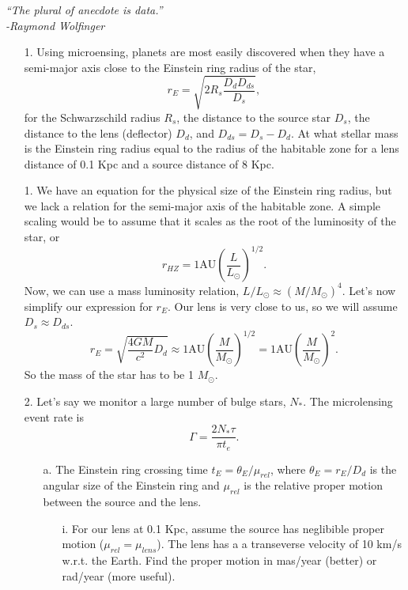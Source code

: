\documentclass[12pt]{article}
\begin{document}
\raggedright
\begin{center}
\textit{``The plural of anecdote is data.''}\\
\hspace{20mm}\textit{-Raymond Wolfinger}
\end{center}

\begin{itemize}
\item[1.] Using microensing, planets are most easily discovered when they have a semi-major axis close to the Einstein ring radius of the star, 
\begin{equation}
r_E = \sqrt{2R_s\frac{D_dD_{ds}}{D_s}},
\end{equation}
for the Schwarzschild radius $R_s$,  the distance to the source star $D_s$, the distance to the lens (deflector) $D_d$, and $D_{ds}=D_s-D_d$. 
At what stellar mass is the Einstein ring radius equal to the radius of the habitable zone for a lens distance of 0.1 Kpc and a source distance of 8 Kpc. 

\item[1.] We have an equation for the physical size of the Einstein ring radius, but we lack a relation for the semi-major axis of the habitable zone. A simple scaling would be to assume that it scales as the root of the luminosity of the star, or 
\begin{equation}
r_{HZ} = 1\text{AU}\left(\frac{L}{L_\odot}\right)^{1/2}.
\end{equation}
Now, we can use a mass luminosity relation, $L/L_\odot\approx (M/M_\odot)^4$. Let's now simplify our expression for $r_E$. Our lens is very close to us, so we will assume $D_s\approx D_{ds}$.
\begin{equation}
r_E = \sqrt{\frac{4GM}{c^2}D_d} \approx 1\textrm{AU} \left(\frac{M}{M_\odot}\right)^{1/2}= 1\textrm{AU}\left(\frac{M}{M_\odot}\right)^2.
\end{equation}
So the mass of the star has to be 1 $M_\odot$.


\item[2.] Let's say we monitor a large number of bulge stars, $N_*$. The microlensing event rate is 
\begin{equation}
\Gamma = \frac{2N_*\tau}{\pi t_e}.
\end{equation}
\begin{itemize}
\item[a.] The Einstein ring crossing time $t_E=\theta_E/\mu_{rel}$, where $\theta_E=r_E/D_d$ is the angular size of the Einstein ring and $\mu_{rel}$ is the relative proper motion between the source and the lens.
\begin{itemize}
\item[i.] For our lens at 0.1 Kpc, assume the source has neglibible proper motion ($\mu_{rel} = \mu_{lens}$). The lens has a a transeverse velocity of 10 km/s w.r.t. the Earth. Find the proper motion in mas/year (better) or rad/year (more useful).


\end{itemize}
\end{itemize}
\end{itemize}
\end{document}
